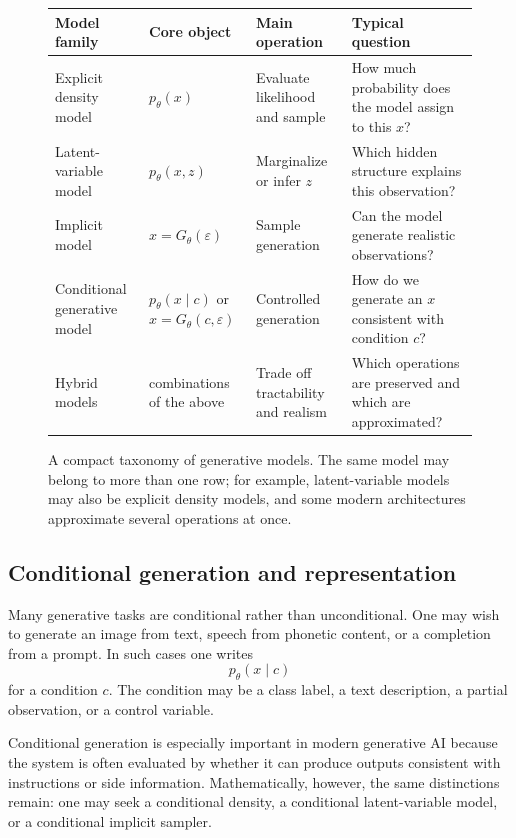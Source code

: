 \begin{figure}[ht]
\centering
\small
\setlength{\tabcolsep}{6pt}
\renewcommand{\arraystretch}{1.25}
\begin{tabular}{|p{3.0cm}|p{3.0cm}|p{3.1cm}|p{3.2cm}|}
\hline
\textbf{Model family} & \textbf{Core object} & \textbf{Main operation} & \textbf{Typical question} \\
\hline
Explicit density model & $p_\theta(x)$ & Evaluate likelihood and sample & How much probability does the model assign to this $x$? \\
\hline
Latent-variable model & $p_\theta(x,z)$ & Marginalize or infer $z$ & Which hidden structure explains this observation? \\
\hline
Implicit model & $x=G_\theta(\varepsilon)$ & Sample generation & Can the model generate realistic observations? \\
\hline
Conditional generative model & $p_\theta(x\mid c)$ or $x=G_\theta(c,\varepsilon)$ & Controlled generation & How do we generate an $x$ consistent with condition $c$? \\
\hline
Hybrid models & combinations of the above & Trade off tractability and realism & Which operations are preserved and which are approximated? \\
\hline
\end{tabular}
\caption{A compact taxonomy of generative models. The same model may belong to more than one row; for example, latent-variable models may also be explicit density models, and some modern architectures approximate several operations at once.}
\label{fig:gen-taxonomy}
\end{figure}

\subsection*{Conditional generation and representation}

Many generative tasks are conditional rather than unconditional.
One may wish to generate an image from text, speech from phonetic content, or a completion from a prompt.
In such cases one writes
\[
p_\theta(x\mid c)
\]
for a condition $c$.
The condition may be a class label, a text description, a partial observation, or a control variable.

\medskip

\noindent
Conditional generation is especially important in modern generative AI because the system is often evaluated by whether it can produce outputs consistent with instructions or side information.
Mathematically, however, the same distinctions remain:
one may seek a conditional density, a conditional latent-variable model, or a conditional implicit sampler.

